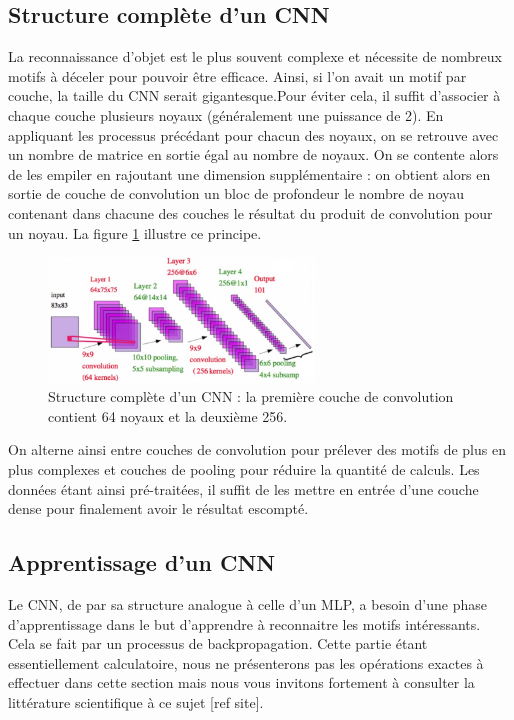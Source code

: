 \subsection{Structure complète d'un CNN}

La reconnaissance d'objet est le plus souvent complexe et nécessite de nombreux motifs à déceler pour pouvoir être efficace. Ainsi, si l'on avait un motif par couche, la taille du CNN serait gigantesque.Pour éviter cela, il suffit d'associer à chaque couche plusieurs noyaux (généralement une puissance de 2). En appliquant les processus précédant pour chacun des noyaux, on se retrouve avec un nombre de matrice en sortie égal au nombre de noyaux. On se contente alors de les empiler en rajoutant une dimension supplémentaire : on obtient alors en sortie de couche de convolution un bloc de profondeur le nombre de noyau contenant dans chacune des couches  le résultat du produit de convolution pour un noyau. La figure \ref{structure_CNN_2} illustre ce principe.

\begin{figure}[!h]
\centering
\includegraphics[width=200pt]{images/cnn/structure_CNN_2.png}
\caption{Structure complète d'un CNN : la première couche de convolution contient 64 noyaux et la deuxième 256.}
\label{structure_CNN_2}
\end{figure}

On alterne ainsi entre couches de convolution pour prélever des motifs de plus en plus complexes et couches de pooling pour réduire la quantité de calculs. Les données étant ainsi pré-traitées, il suffit de les mettre en entrée d'une couche dense pour finalement avoir le résultat escompté.

\subsection{Apprentissage d'un CNN}

Le CNN, de par sa structure analogue à celle d'un MLP, a besoin d'une phase d'apprentissage dans le but d'apprendre à reconnaitre les motifs intéressants. Cela se fait par un processus de backpropagation. Cette partie étant essentiellement calculatoire, nous ne présenterons pas les opérations exactes à effectuer dans cette section mais nous vous invitons fortement à consulter la littérature scientifique à ce sujet [ref site].


